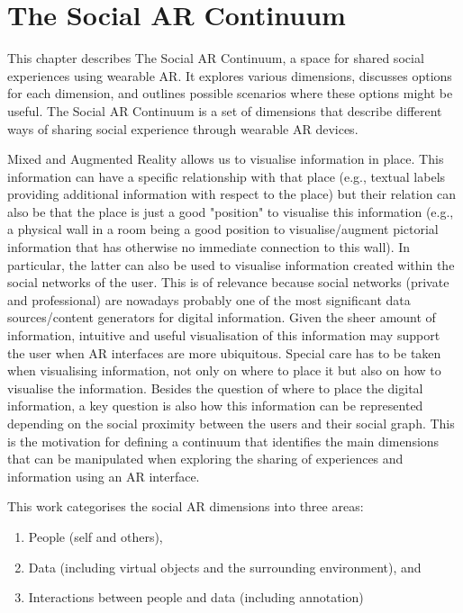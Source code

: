 \chapter{The Social AR Continuum}
\label{ch:continuum}

This chapter describes The Social AR Continuum, a space for shared social experiences using wearable AR. It explores various dimensions, discusses options for each dimension, and outlines possible scenarios where these options might be useful. The Social AR Continuum is a set of dimensions that describe different ways of sharing social experience through wearable AR devices. 

Mixed and Augmented Reality allows us to visualise information in place. This information can have a specific relationship with that place (e.g., textual labels providing additional information with respect to the place) but their relation can also be that the place is just a good "position" to visualise this information (e.g., a physical wall in a room being a good position to visualise/augment pictorial information that has otherwise no immediate connection to this wall). In particular, the latter can also be used to visualise information created within the social networks of the user. This is of relevance because social networks (private and professional) are nowadays probably one of the most significant data sources/content generators for digital information. Given the sheer amount of information, intuitive and useful visualisation of this information may support the user when AR interfaces are more ubiquitous. Special care has to be taken when visualising information, not only on where to place it but also on how to visualise the information. Besides the question of where to place the digital information, a key question is also how this information can be represented depending on the social proximity between the users and their social graph. This is the motivation for defining a continuum that identifies the main dimensions that can be manipulated when exploring the sharing of experiences and information using an AR interface. 

This work categorises the social AR dimensions into three areas: 
\begin{enumerate}
    \item People (self and others),
    \item Data (including virtual objects and the surrounding environment), and
    \item Interactions between people and data (including annotation)
\end{enumerate}

